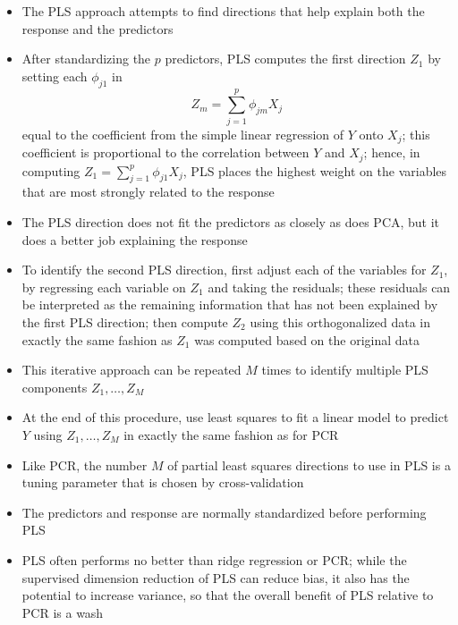 \documentclass[12pt]{article}
\begin{document}
\begin{itemize}
\item The PLS approach attempts to find directions that help explain both the response and the predictors 
\item After standardizing the $p$ predictors, PLS computes the first direction $Z_1$ by setting each $\phi_{j1}$ in $$ Z_m = \sum_{j=1}^p \phi_{jm}X_j $$ equal to the coefficient from the simple linear regression of $Y$ onto $X_j$; this coefficient is proportional to the correlation between $Y$ and $X_j$; hence, in computing $Z_1 = \sum_{j=1}^p \phi_{j1}X_j$, PLS places the highest weight on the variables that are most strongly related to the response 
\item The PLS direction does not fit the predictors as closely as does PCA, but it does a better job explaining the response
\item To identify the second PLS direction, first adjust each of the variables for $Z_1$, by regressing each variable on $Z_1$ and taking the residuals; these residuals can be interpreted as the remaining information that has not been explained by the first PLS direction; then compute $Z_2$ using this orthogonalized data in exactly the same fashion as $Z_1$ was computed based on the original data 
\item This iterative approach can be repeated $M$ times to identify multiple PLS components $Z_1,\dots,Z_M$
\item At the end of this  procedure, use least squares to fit a linear model to predict $Y$ using $Z_1,\dots,Z_M$ in exactly the same fashion as for PCR 
\item Like PCR, the number $M$ of partial least squares directions to use in PLS is a tuning parameter that is chosen by cross-validation 
\item The predictors and response are normally standardized before performing PLS
\item PLS often performs no better than ridge regression or PCR; while the supervised dimension reduction of PLS can reduce bias, it also has the potential to increase variance, so that the overall benefit of PLS relative to PCR is a wash 
\end{itemize}
\end{document}
